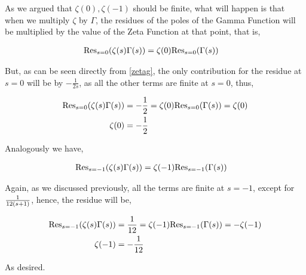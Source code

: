 As we argued that $\zeta(0),\zeta(-1)$ should be finite, what will happen is that when we multiply $\zeta$ by $\Gamma$, the residues of the poles of the Gamma Function will be 
multiplied by the value of the Zeta Function at that point, that is,

\begin{align*}
    \textnormal{Res}_{s=0}\qty(\zeta\qty(s)\Gamma\qty(s))&=\zeta\qty(0)\textnormal{Res}_{s=0}\qty(\Gamma\qty(s))
\end{align*}

But, as can be seen directly from \ref{zetag}, the only contribution for the residue at $s=0$ will be by $-\frac{1}{2s}$, as all the other terms are finite at $s=0$, 
thus,

\begin{align*}
    \textnormal{Res}_{s=0}\qty(\zeta\qty(s)\Gamma\qty(s))&=-\frac12=\zeta\qty(0)\textnormal{Res}_{s=0}\qty(\Gamma\qty(s))=\zeta(0)\\
    \zeta\qty(0)&=-\frac12
\end{align*}

Analogously we have,

\begin{align*}
    \textnormal{Res}_{s=-1}\qty(\zeta\qty(s)\Gamma\qty(s))&=\zeta\qty(-1)\textnormal{Res}_{s=-1}\qty(\Gamma\qty(s))
\end{align*}

Again, as we discussed previously, all the terms are finite at $s=-1$, except for $\frac{1}{12\qty(s+1)}$, hence, the residue will be,

\begin{align*}
    \textnormal{Res}_{s=-1}\qty(\zeta\qty(s)\Gamma\qty(s))&=\frac{1}{12}=\zeta\qty(-1)\textnormal{Res}_{s=-1}\qty(\Gamma\qty(s))=-\zeta\qty(-1)\\
    \zeta(-1)&=-\frac{1}{12}
\end{align*}

As desired.